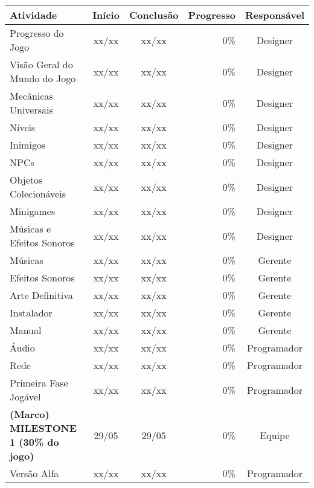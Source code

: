 \documentclass[a4paper, 11pt]{article} %
\begin{document}
\newpage
\begin{table}[h]
\centering
\begin{tabular}{lccrc}
\toprule
\textbf{Atividade} & \textbf{Início} & \textbf{Conclusão} & \textbf{Progresso} & \textbf{Responsável} \\
\midrule
Progresso do Jogo                    & xx/xx & xx/xx & 0\%   & Designer \\
\rowcolor[gray]{0.9}
Visão Geral do Mundo do Jogo         & xx/xx & xx/xx & 0\%   & Designer \\
Mecânicas Universais                 & xx/xx & xx/xx & 0\%   & Designer \\
\rowcolor[gray]{0.9}
Níveis                               & xx/xx & xx/xx & 0\%   & Designer \\
Inimigos                             & xx/xx & xx/xx & 0\%   & Designer \\
\rowcolor[gray]{0.9}
NPCs                                 & xx/xx & xx/xx & 0\%   & Designer \\
Objetos Colecionáveis                & xx/xx & xx/xx & 0\%   & Designer \\
\rowcolor[gray]{0.9}
Minigames                            & xx/xx & xx/xx & 0\%   & Designer \\
Músicas e Efeitos Sonoros            & xx/xx & xx/xx & 0\%   & Designer \\
\rowcolor[gray]{0.9}
Músicas                              & xx/xx & xx/xx & 0\%   & Gerente \\
Efeitos Sonoros                      & xx/xx & xx/xx & 0\%   & Gerente \\
\rowcolor[gray]{0.9}
Arte Definitiva                      & xx/xx & xx/xx & 0\%   & Gerente \\
Instalador                           & xx/xx & xx/xx & 0\%   & Gerente \\
\rowcolor[gray]{0.9}
Manual                               & xx/xx & xx/xx & 0\%   & Gerente \\
Áudio                                & xx/xx & xx/xx & 0\%   & Programador \\
\rowcolor[gray]{0.9}
Rede                                 & xx/xx & xx/xx & 0\%   & Programador \\
Primeira Fase Jogável                & xx/xx & xx/xx & 0\%   & Programador \\
\midrule
\rowcolor[gray]{0.7}
\textbf{(Marco) MILESTONE 1 (30\% do jogo)} & 29/05 & 29/05 & 0\% & Equipe\\
\midrule
Versão Alfa                          & xx/xx & xx/xx & 0\%   & Programador \\

\end{tabular}
\end{table}
\end{document}
